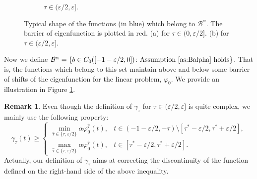 \documentclass[a4paper,11pt]{article}
\theoremstyle{plain}
\theoremstyle{definition}
\newtheorem{remark}[thm]{Remark}
\theoremstyle{definition}
\newcommand{\B}{\mathcal{B}}
\newcommand{\e}{\mathrm{e}}
\numberwithin{equation}{section}
\begin{document}
\begin{figure}[t]
\begin{subfigure}{\textwidth}
    \caption{$\tau\in(\varepsilon/2,\varepsilon]$.}
    \end{subfigure}
    \caption{Typical shape of the functions (in blue) which belong to $\B^\alpha$. The barrier of eigenfunction is plotted in red. (a) for $\tau\in(0, \varepsilon/2]$. (b) for $\tau\in (\varepsilon/2, \varepsilon]$.}
    \label{fig:B}
\end{figure}

Now we define $\B^\alpha = \{ b\in C_0([-1-\varepsilon/2,0]) \colon \text{Assumption \ref{as:Balpha} holds} \}$. That is, the functions which belong to this set maintain above and below some barrier of shifts of the eigenfunction for the linear problem, $\varphi_0$. We provide an illustration in Figure \ref{fig:B}.
\begin{remark}
Even though the definition of $\gamma_\tau$ for $\tau\in(\varepsilon/2,\varepsilon]$ is quite complex, we mainly use the following property: 
\[
    \gamma_\tau(t) \geq \begin{cases}
    \displaystyle
    \min_{\hat{\tau}\in\{\tau,\varepsilon/2\}} \alpha\varphi_0^{\hat{\tau}}(t), & t\in(-1-\varepsilon/2,-\tau)\setminus[\tau^*-\varepsilon/2,\tau^*+\varepsilon/2], \\
    \displaystyle \max_{\hat{\tau}\in\{\tau,\varepsilon/2\}} \alpha\varphi_0^{\hat{\tau}}(t), & t\in[\tau^*-\varepsilon/2,\tau^*+\varepsilon/2].
    \end{cases}
\]
Actually, our definition of $\gamma_\tau$ aims at correcting the discontinuity of the function defined on the right-hand side of the above inequality.
\end{remark}
\end{document}
